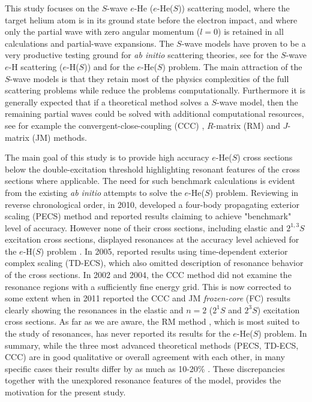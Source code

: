 \documentclass[aip
, pra
, showpacs
, aps
, twocolumn
, groupedaddress
, floatfix
]{revtex4}
\begin{document}
This study focuses on the $S$-wave $e$-He ($e$-He($S$)) scattering model,
where the target helium atom is in its ground state before the electron impact,
and where only the partial wave with zero angular momentum ($l=0$) is retained in all calculations
and partial-wave expansions.
The $S$-wave models have proven to be a very productive testing ground for {\it ab initio} scattering theories,
see \cite{T62,HY74p1209,P78,P80,P81,CO84,BS92p53,BST93,KM94pL407,IDHF95,PS96,JS02,JS00l,BRIM99,S99l,MHR02,BS04,Frapiccini10} for the $S$-wave $e$-H scattering ($e$-H($S$))
and \cite{DHIF94,PMR99,PBFS02,PNBFS04,HMR05R,HMR05,BS10p022715,BS10p022716,KFB11} for  the $e$-He($S$) problem.
The main attraction of the $S$-wave models is that they retain most of the physics complexities of the full
scattering problems while reduce the problems computationally.
Furthermore it is generally expected that if a theoretical method solves a $S$-wave model, then
the remaining partial waves could be solved with additional computational resources,
see for example the convergent-close-coupling (CCC) \cite{FB95},
$R$-matrix (RM) \cite{FLRS94b, PhysRevA.54.R998, SMC2006}
and $J$-matrix (JM) \cite{KM94pL741,KM95pL139} methods.


The main goal of this study is to provide high accuracy $e$-He($S$) cross sections below the double-excitation threshold
highlighting resonant features of the cross sections where applicable.
The need for such benchmark calculations is evident from the existing {\em ab initio} attempts to solve the $e$-He($S$) problem.
Reviewing in reverse chronological order, in 2010, \citet{BS10p022715} developed a four-body propagating exterior scaling (PECS) method and reported results claiming to achieve "benchmark" level of accuracy.
However none of their cross sections, including elastic and $2^{1,3}S$ excitation cross sections,
displayed resonances at the accuracy level achieved for the $e$-H($S$) problem \cite{P78}.
In 2005, \citet{HMR05} reported results using
time-dependent exterior complex scaling (TD-ECS), which also omitted description of resonance behavior of the cross sections.
In 2002 and 2004, the CCC method \cite{PBFS02,PNBFS04} did not examine the resonance regions with a sufficiently fine energy grid.
This is now corrected to some extent when in 2011 \citet{KFB11} reported the CCC and JM {\em frozen-core}
(FC) results clearly showing the resonances in the elastic and $n=2$ ($2^1S$ and $2^3S$) excitation cross sections.
As far as we are aware, the RM method \cite{FLRS94b, SMC2006}, which is most suited to the study of resonances,
has never reported its results for the $e$-He($S$) problem.
In summary, while the three most advanced theoretical methods (PECS, TD-ECS, CCC) are in good qualitative or overall agreement with each other,
in many specific cases their results differ by as much as 10-20\% \cite{BS10p022715,HMR05}.
These discrepancies together with the unexplored resonance features of the model,
provides the motivation for the present study.
\end{document}
